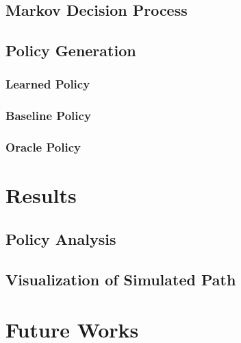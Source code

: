 \documentclass[letterpaper, 10 pt, conference]{ieeeconf}
\begin{document}
\subsection{Markov Decision Process}

\subsection{Policy Generation}
\subsubsection{Learned Policy}

\subsubsection{Baseline Policy}

\subsubsection{Oracle Policy}

\section{Results}
\subsection{Policy Analysis}

\subsection{Visualization of Simulated Path}

\section{Future Works}

% 
\end{document}

